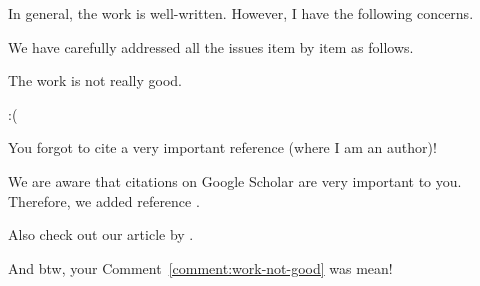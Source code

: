 \documentclass[11pt,american]{scrartcl}
\begin{document}
\reviewer
\begin{generalcomment}
	In general, the work is well-written. However, I have the following concerns.
\end{generalcomment}
\begin{revresponse}
	We have carefully addressed all the issues item by item as follows.
\end{revresponse}

\begin{revcomment}\label{comment:work-not-good}
	The work is not really good.
\end{revcomment}
\begin{revresponse}
	:(
\end{revresponse}

\begin{revcomment}
	You forgot to cite a very important reference (where I am an author)!
\end{revcomment}
\begin{revresponse}
	We are aware that citations on Google Scholar are very important to you.
	Therefore, we added reference \citep{greenwade93}.
	
	Also check out our article by \citet{greenwade93}.
	
	And btw, your Comment~\ref{comment:work-not-good} was mean!
\end{revresponse}
\end{document}
